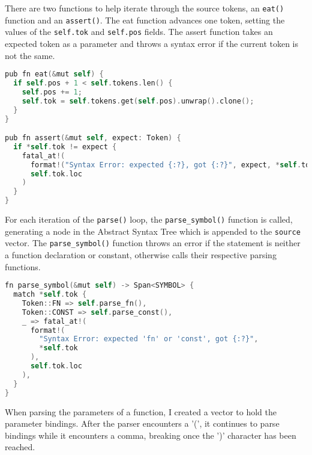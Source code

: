 There are two functions to help iterate through the source tokens, an \texttt{eat()} function and an \texttt{assert()}. The eat function advances one token, setting the values of the \texttt{self.tok} and \texttt{self.pos} fields. The assert function takes an expected token as a parameter and throws a syntax error if the current token is not the same.

\begin{lstlisting}[language=C]
pub fn eat(&mut self) {
  if self.pos + 1 < self.tokens.len() {
    self.pos += 1;
    self.tok = self.tokens.get(self.pos).unwrap().clone();
  }
}

pub fn assert(&mut self, expect: Token) {
  if *self.tok != expect {
    fatal_at!(
      format!("Syntax Error: expected {:?}, got {:?}", expect, *self.tok),
      self.tok.loc
    )
  }
}
\end{lstlisting}

For each iteration of the \texttt{parse()} loop, the \texttt{parse\_symbol()} function is called, generating a node in the Abstract Syntax Tree which is appended to the \texttt{source} vector. The \texttt{parse\_symbol()} function throws an error if the statement is neither a function declaration or constant, otherwise calls their respective parsing functions.

\begin{lstlisting}[language=C]
fn parse_symbol(&mut self) -> Span<SYMBOL> {
  match *self.tok {
    Token::FN => self.parse_fn(),
    Token::CONST => self.parse_const(),
    _ => fatal_at!(
      format!(
        "Syntax Error: expected 'fn' or 'const', got {:?}",
        *self.tok
      ),
      self.tok.loc
    ),
  }
}
\end{lstlisting}

When parsing the parameters of a function, I created a vector to hold the parameter bindings. After the parser encounters a '(', it continues to parse bindings while it encounters a comma, breaking once the ')' character has been reached.

